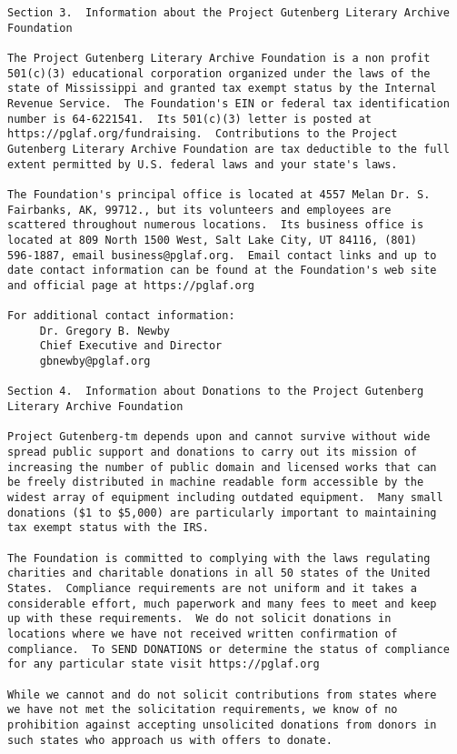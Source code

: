 \documentclass[letterpaper,12pt,oneside,openany]{memoir}
\begin{document}
\begin{verbatim}
Section 3.  Information about the Project Gutenberg Literary Archive
Foundation

The Project Gutenberg Literary Archive Foundation is a non profit
501(c)(3) educational corporation organized under the laws of the
state of Mississippi and granted tax exempt status by the Internal
Revenue Service.  The Foundation's EIN or federal tax identification
number is 64-6221541.  Its 501(c)(3) letter is posted at
https://pglaf.org/fundraising.  Contributions to the Project
Gutenberg Literary Archive Foundation are tax deductible to the full
extent permitted by U.S. federal laws and your state's laws.

The Foundation's principal office is located at 4557 Melan Dr. S.
Fairbanks, AK, 99712., but its volunteers and employees are
scattered throughout numerous locations.  Its business office is
located at 809 North 1500 West, Salt Lake City, UT 84116, (801)
596-1887, email business@pglaf.org.  Email contact links and up to
date contact information can be found at the Foundation's web site
and official page at https://pglaf.org

For additional contact information:
     Dr. Gregory B. Newby
     Chief Executive and Director
     gbnewby@pglaf.org

Section 4.  Information about Donations to the Project Gutenberg
Literary Archive Foundation

Project Gutenberg-tm depends upon and cannot survive without wide
spread public support and donations to carry out its mission of
increasing the number of public domain and licensed works that can
be freely distributed in machine readable form accessible by the
widest array of equipment including outdated equipment.  Many small
donations ($1 to $5,000) are particularly important to maintaining
tax exempt status with the IRS.

The Foundation is committed to complying with the laws regulating
charities and charitable donations in all 50 states of the United
States.  Compliance requirements are not uniform and it takes a
considerable effort, much paperwork and many fees to meet and keep
up with these requirements.  We do not solicit donations in
locations where we have not received written confirmation of
compliance.  To SEND DONATIONS or determine the status of compliance
for any particular state visit https://pglaf.org

While we cannot and do not solicit contributions from states where
we have not met the solicitation requirements, we know of no
prohibition against accepting unsolicited donations from donors in
such states who approach us with offers to donate.


\end{verbatim}
\end{document}
